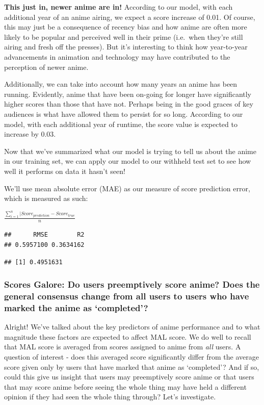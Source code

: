 \documentclass[
]{article}
\begin{document}
\textbf{This just in, newer anime are in!} According to our model, with
each additional year of an anime airing, we expect a score increase of
0.01. Of course, this may just be a consequence of recency bias and how
anime are often more likely to be popular and perceived well in their
prime (i.e.~when they're still airing and fresh off the presses). But
it's interesting to think how year-to-year advancements in animation and
technology may have contributed to the perception of newer anime.

Additionally, we can take into account how many years an anime has been
running. Evidently, anime that have been on-going for longer have
significantly higher scores than those that have not. Perhaps being in
the good graces of key audiences is what have allowed them to persist
for so long. According to our model, with each additional year of
runtime, the score value is expected to increase by 0.03.

Now that we've summarized what our model is trying to tell us about the
anime in our training set, we can apply our model to our withheld test
set to see how well it performs on data it hasn't seen!

We'll use mean absolute error (MAE) as our measure of score prediction
error, which is measured as such:

\(\frac{\sum_{i=1}^n |Score_{prediction} - Score_{true}}{n}\)

\begin{verbatim}
##      RMSE        R2 
## 0.5957100 0.3634162
\end{verbatim}

\begin{verbatim}
## [1] 0.4951631
\end{verbatim}

\hypertarget{scores-galore-do-users-preemptively-score-anime-does-the-general-consensus-change-from-all-users-to-users-who-have-marked-the-anime-as-completed}{%
\subsubsection{Scores Galore: Do users preemptively score anime? Does
the general consensus change from all users to users who have marked the
anime as
`completed'?}\label{scores-galore-do-users-preemptively-score-anime-does-the-general-consensus-change-from-all-users-to-users-who-have-marked-the-anime-as-completed}}

Alright! We've talked about the key predictors of anime performance and
to what magnitude these factors are expected to affect MAL score. We do
well to recall that MAL score is averaged from scores assigned to anime
from \emph{all} users. A question of interest - does this averaged score
significantly differ from the average score given only by users that
have marked that anime as `completed'? And if so, could this give us
insight that users may preemptively score anime or that users that may
score anime before seeing the whole thing may have held a different
opinion if they had seen the whole thing through? Let's investigate.
\end{document}
